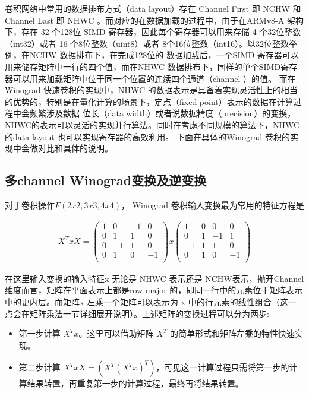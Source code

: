 卷积网络中常用的数据排布方式（data layout）存在 Channel First 即 NCHW 和 Channel Last 即 NHWC 。而对应的在数据加载的过程中，由于在ARMv8-A 架构下，存在 32 个128位
SIMD 寄存器，因此每个寄存器可以用来存储 4 个32位整数（int32）或者 16 个8位整数（uint8）或者 8个16位整数（int16）。以32位整数举例，在NCHW 数据排布下，在完成128位的
数据加载后，一个SIMD 寄存器可以用来储存矩阵中一行的四个值，而在NHWC 数据排布下，同样的单个SIMD寄存器可以用来加载矩阵中位于同一个位置的连续四个通道（channel ）的值。
而在Winograd 快速卷积的实现中，NHWC 的数据表示是具备着实现灵活性上的相当的优势的，特别是在量化计算的场景下，定点（fixed point）表示的数据在计算过程中会频繁涉及数据
位长（data width）或者说数据精度（precision）的变换，NHWC的表示可以灵活的实现并行算法。同时在考虑不同规模的算法下，NHWC的data layout 也可以实现寄存器的高效利用。
下面在具体的Winograd 卷积的实现中会做对比和具体的说明。

\subsection{多channel Winograd变换及逆变换}

对于卷积操作$F(2x2, 3x3, 4x4)$， Winograd 卷积输入变换最为常用的特征方程是

\begin{align}
  X^T x X = 
  \begin{pmatrix}
    1 & 0 & -1 & 0 \\
    0 & 1 & 1 & 0 \\
    0 & -1 & 1 & 0 \\
    0 & 1 & 0 & -1 \\
  \end{pmatrix}
  x
  \begin{pmatrix}
    1 & 0 & 0 & 0 \\
    0 & 1 & -1 & 1 \\
    -1 & 1 & 1 & 0 \\
    0 & 1 & 0 & -1 \\
  \end{pmatrix}
\end{align}

在这里输入变换的输入特征x 无论是 NHWC 表示还是 NCHW表示，抛开Channel 维度而言，矩阵在平面表示上都是row major 的，即同一行中的元素位于矩阵表示中的更内层。而矩阵x
左乘一个矩阵可以表示为 x 中的行元素的线性组合（这一点会在矩阵乘法一节详细展开说明）。上述矩阵的变换过程可以分为两步:

\begin{itemize}
\item 第一步计算 $X^T x $。这里可以借助矩阵 $X^T$ 的简单形式和矩阵左乘的特性快速实现。
\item 第二步计算 $X^T x X = (X^T(X^T x)^T)$，可见这一计算过程只需将第一步的计算结果转置，再重复第一步的计算过程，最终再将结果转置。
\end{itemize}

